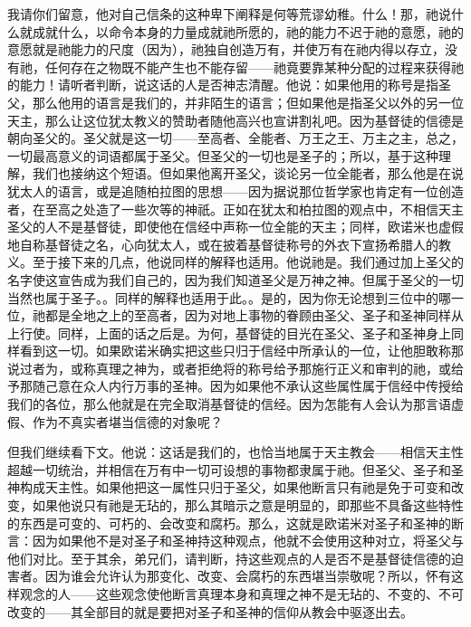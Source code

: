我请你们留意，他对自己信条的这种卑下阐释是何等荒谬幼稚。什么！那，祂说什么就成就什么，以命令本身的力量成就祂所愿的，祂的能力不迟于祂的意愿，祂的意愿就是祂能力的尺度（因为），祂独自创造万有，并使万有在祂内得以存立，没有祂，任何存在之物既不能产生也不能存留——祂竟要靠某种分配的过程来获得祂的能力！请听者判断，说这话的人是否神志清醒。他说：如果他用的称号是指圣父，那么他用的语言是我们的，并非陌生的语言；但如果他是指圣父以外的另一位天主，那么让这位犹太教义的赞助者随他高兴也宣讲割礼吧。因为基督徒的信德是朝向圣父的。圣父就是这一切——至高者、全能者、万王之王、万主之主，总之，一切最高意义的词语都属于圣父。但圣父的一切也是圣子的；所以，基于这种理解，我们也接纳这个短语。但如果他离开圣父，谈论另一位全能者，那么他是在说犹太人的语言，或是追随柏拉图的思想——因为据说那位哲学家也肯定有一位创造者，在至高之处造了一些次等的神祇。正如在犹太和柏拉图的观点中，不相信天主圣父的人不是基督徒，即使他在信经中声称一位全能的天主；同样，欧诺米也虚假地自称基督徒之名，心向犹太人，或在披着基督徒称号的外衣下宣扬希腊人的教义。至于接下来的几点，他说同样的解释也适用。他说祂是。我们通过加上圣父的名字使这宣告成为我们自己的，因为我们知道圣父是万神之神。但属于圣父的一切当然也属于圣子。。同样的解释也适用于此。。是的，因为你无论想到三位中的哪一位，祂都是全地之上的至高者，因为对地上事物的眷顾由圣父、圣子和圣神同样从上行使。同样，上面的话之后是。为何，基督徒的目光在圣父、圣子和圣神身上同样看到这一切。如果欧诺米确实把这些只归于信经中所承认的一位，让他胆敢称那说过者为，或称真理之神为，或者拒绝将的称号给予那施行正义和审判的祂，或给予那随己意在众人内行万事的圣神。因为如果他不承认这些属性属于信经中传授给我们的各位，那么他就是在完全取消基督徒的信经。因为怎能有人会认为那言语虚假、作为不真实者堪当信德的对象呢？\par

但我们继续看下文。他说：这话是我们的，也恰当地属于天主教会——相信天主性超越一切统治，并相信在万有中一切可设想的事物都隶属于祂。但圣父、圣子和圣神构成天主性。如果他把这一属性只归于圣父，如果他断言只有祂是免于可变和改变，如果他说只有祂是无玷的，那么其暗示之意是明显的，即那些不具备这些特性的东西是可变的、可朽的、会改变和腐朽。那么，这就是欧诺米对圣子和圣神的断言：因为如果他不是对圣子和圣神持这种观点，他就不会使用这种对立，将圣父与他们对比。至于其余，弟兄们，请判断，持这些观点的人是否不是基督徒信德的迫害者。因为谁会允许认为那变化、改变、会腐朽的东西堪当崇敬呢？所以，怀有这样观念的人——这些观念使他断言真理本身和真理之神不是无玷的、不变的、不可改变的——其全部目的就是要把对圣子和圣神的信仰从教会中驱逐出去。\par


